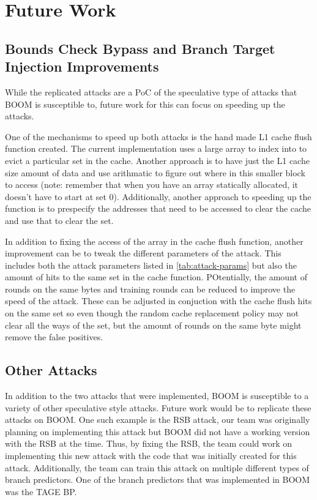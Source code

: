 \section{Future Work}

\subsection{Bounds Check Bypass and Branch Target Injection Improvements}

While the replicated attacks are a PoC of the speculative type of attacks that BOOM
is susceptible to, future work for this can focus on speeding up the attacks. 

One of the mechanisms to speed up both attacks is the hand made L1 cache flush function
created. The current implementation uses a large array to index into to evict a particular
set in the cache. Another approach is to have just the L1 cache size amount of data and use 
arithmatic to figure out where in this smaller block to access (note: remember that when
you have an array statically allocated, it doesn't have to start at set 0). Additionally,
another approach to speeding up the function is to prespecify the addresses that need to be
accessed to clear the cache and use that to clear the set. 

In addition to fixing the access of the array in the cache flush function, another
improvement can be to tweak the different parameters of the attack. This includes
both the attack parameters listed in \ref{tab:attack-params} but also the amount of
hits to the same set in the cache function. POtentially, the amount of rounds on the
same bytes and training rounds can be reduced to improve the speed of the attack.
These can be adjusted in conjuction with the cache flush hits on the same set so even though the 
random cache replacement policy may not clear all the ways of the set, but the amount of rounds on
the same byte might remove the false positives.

\subsection{Other Attacks}

In addition to the two attacks that were implemented, BOOM is susceptible to a variety of
other speculative style attacks. Future work would be to replicate these attacks on BOOM.
One such example is the RSB attack, our team was originally planning on implementing this
attack but BOOM did not have a working version with the RSB at the time. Thus, by fixing 
the RSB, the team could work on implementing this new attack with the code that was initially
created for this attack. Additionally, the team can train this attack on multiple different
types of branch predictors. One of the branch predictors that was implemented in BOOM was
the TAGE BP. 

